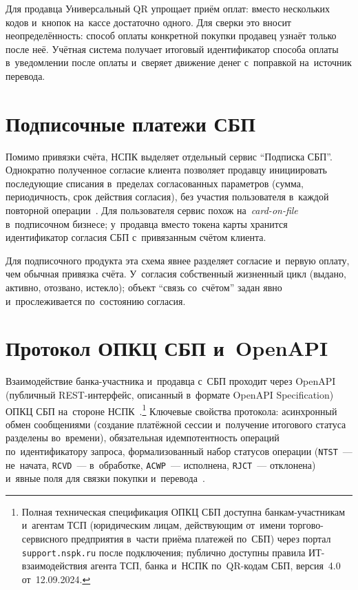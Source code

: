 Для продавца Универсальный QR упрощает приём оплат: вместо нескольких кодов
и~кнопок на~кассе достаточно одного. Для сверки это вносит неопределённость:
способ оплаты конкретной покупки продавец узнаёт только после неё. Учётная
система получает итоговый идентификатор способа оплаты в~уведомлении после оплаты
и~сверяет движение денег с~поправкой на~источник перевода.

\section{Подписочные платежи СБП}\label{sec:sbp-subscription}

Помимо привязки счёта, НСПК выделяет
отдельный сервис \enquote{Подписка СБП}. Однократно полученное согласие клиента
позволяет продавцу инициировать последующие списания в~пределах согласованных
параметров (сумма, периодичность, срок действия согласия), без участия
пользователя в~каждой повторной операции~\cite{nspk-sbp-subscription}. Для
пользователя сервис похож на~\textit{card-on-file} в~подписочном бизнесе;
у~продавца вместо токена карты хранится идентификатор согласия СБП
с~привязанным счётом клиента.

Для подписочного продукта эта схема явнее разделяет согласие и~первую оплату,
чем обычная привязка счёта. У~согласия собственный жизненный цикл (выдано,
активно, отозвано, истекло); объект \enquote{связь со~счётом} задан явно
и~прослеживается по~состоянию согласия.

\section{Протокол ОПКЦ СБП и~OpenAPI}\label{sec:sbp-protocol}

Взаимодействие банка-участника и~продавца с~СБП проходит через OpenAPI
(публичный REST-интерфейс, описанный в~формате OpenAPI Specification) ОПКЦ СБП
на~стороне НСПК~\cite{nspk-sbp-openapi}.\footnote{Полная техническая
  спецификация ОПКЦ СБП доступна банкам-участникам и~агентам ТСП (юридическим
    лицам, действующим от~имени торгово-сервисного предприятия в~части приёма
  платежей по~СБП) через портал \texttt{support.nspk.ru} после подключения;
  публично доступны правила ИТ-взаимодействия агента ТСП, банка и~НСПК
по~QR-кодам СБП, версия~4.0 от~12.09.2024.} Ключевые свойства
протокола: асинхронный обмен сообщениями (создание платёжной сессии и~получение
итогового статуса разделены во~времени), обязательная идемпотентность операций
по~идентификатору запроса, формализованный набор статусов операции
(\texttt{NTST}~--- не~начата, \texttt{RCVD}~--- в~обработке,
\texttt{ACWP}~--- исполнена, \texttt{RJCT}~--- отклонена) и~явные поля для
связки покупки и~перевода~\cite{nspk-sbp-openapi}.


